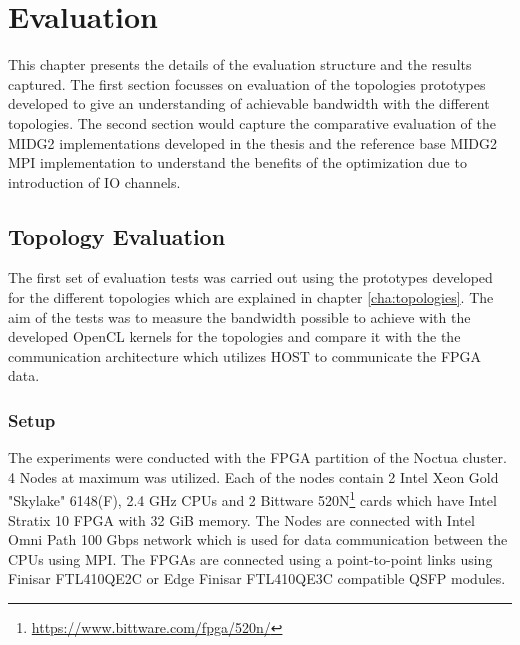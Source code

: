 \chapter{Evaluation}
\label{cha:Evaluation}

This chapter presents the details of the evaluation structure and the results
captured. The first section focusses on evaluation of the topologies prototypes
developed to give an understanding of achievable bandwidth with the different
topologies. The second section would capture the comparative evaluation of
the MIDG2 implementations developed in the thesis and the reference base MIDG2
MPI implementation to understand the benefits of the optimization due to introduction
of IO channels.

\section{Topology Evaluation}

The first set of evaluation tests was carried out using the prototypes
developed for the different topologies which are explained in chapter \ref{cha:topologies}.
The aim of the tests was to measure the bandwidth possible to achieve with the
developed OpenCL kernels for the topologies and compare it with the
the communication architecture which utilizes HOST to communicate the
FPGA data.

\subsection{Setup}

The experiments were conducted with the FPGA partition of the Noctua
cluster. 4 Nodes at maximum was utilized. Each of the nodes
contain 2 Intel Xeon Gold "Skylake" 6148(F), 2.4 GHz CPUs and
2 Bittware 520N\footnote{\url{https://www.bittware.com/fpga/520n/}}
cards which have Intel Stratix 10 FPGA with 32 GiB memory. The Nodes
are connected with Intel Omni Path 100 Gbps network which is used
for data communication between the CPUs using MPI. The FPGAs
are connected using a point-to-point links using Finisar FTL410QE2C
or Edge Finisar FTL410QE3C compatible QSFP modules.

